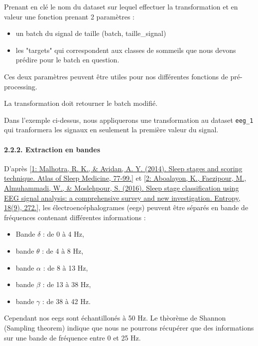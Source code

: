 \documentclass[11pt]{article}
\providecommand{\tightlist}{%
      \setlength{\itemsep}{0pt}\setlength{\parskip}{0pt}}
\begin{document}
    Prenant en clé le nom du dataset sur lequel effectuer la transformation
et en valeur une fonction prenant 2 paramètres :

\begin{itemize}
\tightlist
\item
  un batch du signal de taille (batch, taille\_signal)
\item
  les "targets" qui correspondent aux classes de sommeils que nous
  devons prédire pour le batch en question.
\end{itemize}

Ces deux paramètres peuvent être utiles pour nos différentes fonctions
de pré-processing.

La transformation doit retourner le batch modifié.

Dans l'exemple ci-dessus, nous appliquerons une transformation au
dataset \texttt{eeg\_1} qui tranformera les signaux en seulement la
première valeur du signal.

    \paragraph{2.2.2. Extraction en bandes}\label{extraction-en-bandes}

D'après
{[}\href{http://www.fmed.edu.uy/sites/www.labsueno.fmed.edu.uy/files/9.Diagnostico-polisomnogr\%C3\%A1fico.pdf}{1:
Malhotra, R. K., \& Avidan, A. Y. (2014). Sleep stages and scoring
technique. Atlas of Sleep Medicine, 77-99.}{]} et
{[}\href{https://www.mdpi.com/1099-4300/18/9/272}{2: Aboalayon, K.,
Faezipour, M., Almuhammadi, W., \& Moslehpour, S. (2016). Sleep stage
classification using EEG signal analysis: a comprehensive survey and new
investigation. Entropy, 18(9), 272.}{]}, les électroencéphalogrames
(eegs) peuvent être séparés en bande de fréquences contenant différentes
informations :

\begin{itemize}
\tightlist
\item
  Bande \(\delta\) : de 0 à 4 Hz,
\item
  bande \(\theta\) : de 4 à 8 Hz,
\item
  bande \(\alpha\) : de 8 à 13 Hz,
\item
  bande \(\beta\) : de 13 à 38 Hz,
\item
  bande \(\gamma\) : de 38 à 42 Hz.
\end{itemize}

Cependant nos eegs sont échantillonés à 50 Hz. Le thèorème de Shannon
(Sampling theorem) indique que nous ne pourrons récupérer que des
informations sur une bande de fréquence entre 0 et 25 Hz.
\end{document}
